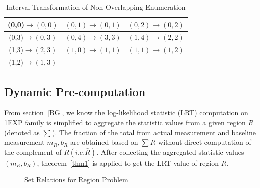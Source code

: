 \documentclass[AMA,LATO1COL]{WileyNJD-v2}
\begin{document}
\begin{table}[t]
\centering \caption{Interval Transformation of Non-Overlapping Enumeration\label{tab:op}}
     \begin{tabular}{|c|c|c|}
	\hline
    (0,0)$\rightarrow (0,0)$  &  $(0,1) \rightarrow (0,1)$&  $(0,2) \rightarrow (0,2)$ \\
    \hline
    (0,3)$\rightarrow (0,3)$  &  $(0,4) \rightarrow (3,3)$&  $(1,4) \rightarrow (2,2)$ \\
    \hline
    (1,3)$\rightarrow (2,3)$  &  $(1,0) \rightarrow (1,1)$&  $(1,1) \rightarrow (1,2)$ \\
    \hline
     (1,2)$\rightarrow (1,3)$  &    &  \\
    \hline
\end{tabular}
\label{ex-nonoverlap}
\end{table}

\subsection{Dynamic Pre-computation}
\label{sec:mov2}
From section~\ref{BG}, we know the log-likelihood statistic (LRT) computation on 1EXP family is simplified to aggregate the statistic values from a given region $R$ (denoted as $\sum $). The fraction of the total from actual measurement and baseline measurement $m_R,b_R$ are obtained based on $\sum R$ without direct computation of the complement of $R (i.e. \bar R)$. After collecting the aggregated statistic values $(m_R,b_R)$, theorem~\ref{thm1} is applied to get the LRT value of region $R$.

\begin{figure}[h]
     \begin{center}
\end{center}
\vspace{-10pt}
\caption{Set Relations for Region Problem}\label{fig:example}
\end{figure}
\end{document}
